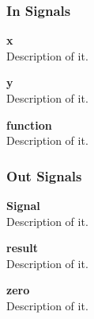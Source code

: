 
\subsubsection{In Signals}

\begin{description}
\item{\textbf{x}} \\
Description of it.
\item{\textbf{y}} \\
Description of it.
\item{\textbf{function}} \\
Description of it.
\end{description}

\subsubsection{Out Signals}

\begin{description}
\item{\textbf{Signal}} \\
Description of it.
\item{\textbf{result}} \\
Description of it.
\item{\textbf{zero}} \\
Description of it.
\end{description}
